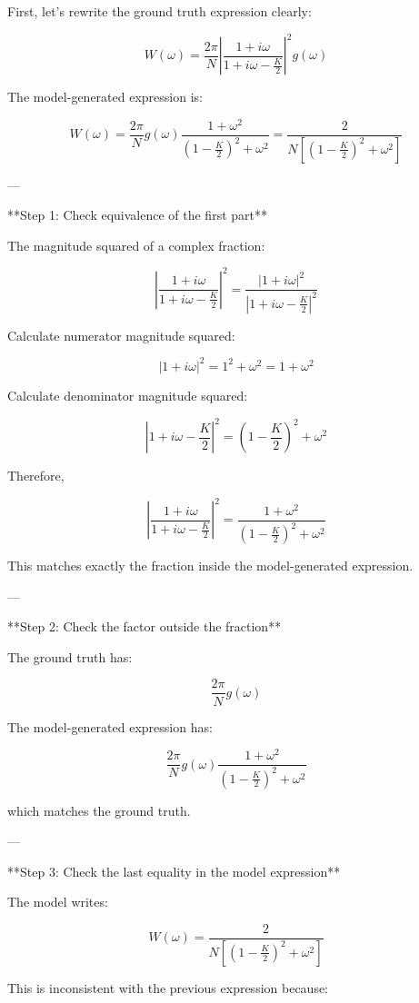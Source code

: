 \documentclass[10pt]{article}
\begin{document}
First, let's rewrite the ground truth expression clearly:

\[
W(\omega) = \frac{2\pi}{N} \left| \frac{1 + i\omega}{1 + i\omega - \frac{K}{2}} \right|^2 g(\omega)
\]

The model-generated expression is:

\[
W(\omega) = \frac{2\pi}{N} g(\omega) \frac{1 + \omega^2}{\left(1 - \frac{K}{2}\right)^2 + \omega^2} = \frac{2}{N \left[\left(1 - \frac{K}{2}\right)^2 + \omega^2\right]}
\]

---

**Step 1: Check equivalence of the first part**

The magnitude squared of a complex fraction:

\[
\left| \frac{1 + i\omega}{1 + i\omega - \frac{K}{2}} \right|^2 = \frac{|1 + i\omega|^2}{|1 + i\omega - \frac{K}{2}|^2}
\]

Calculate numerator magnitude squared:

\[
|1 + i\omega|^2 = 1^2 + \omega^2 = 1 + \omega^2
\]

Calculate denominator magnitude squared:

\[
|1 + i\omega - \frac{K}{2}|^2 = \left(1 - \frac{K}{2}\right)^2 + \omega^2
\]

Therefore,

\[
\left| \frac{1 + i\omega}{1 + i\omega - \frac{K}{2}} \right|^2 = \frac{1 + \omega^2}{\left(1 - \frac{K}{2}\right)^2 + \omega^2}
\]

This matches exactly the fraction inside the model-generated expression.

---

**Step 2: Check the factor outside the fraction**

The ground truth has:

\[
\frac{2\pi}{N} g(\omega)
\]

The model-generated expression has:

\[
\frac{2\pi}{N} g(\omega) \frac{1 + \omega^2}{\left(1 - \frac{K}{2}\right)^2 + \omega^2}
\]

which matches the ground truth.

---

**Step 3: Check the last equality in the model expression**

The model writes:

\[
W(\omega) = \frac{2}{N \left[\left(1 - \frac{K}{2}\right)^2 + \omega^2\right]}
\]

This is inconsistent with the previous expression because:
\end{document}
